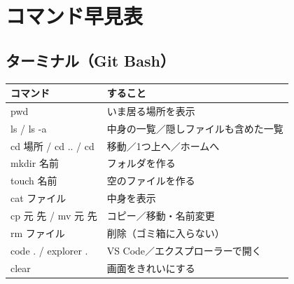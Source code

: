 \chapter{コマンド早見表}

\section*{ターミナル（Git Bash）}
\begin{center}\small
\begin{tabularx}{\linewidth}{>{\ttfamily}l X}
\toprule
\normalfont コマンド & すること \\
\midrule
pwd & いま居る場所を表示 \\
ls / ls -a & 中身の一覧／隠しファイルも含めた一覧 \\
cd 場所 / cd .. / cd & 移動／1つ上へ／ホームへ \\
mkdir 名前 & フォルダを作る \\
touch 名前 & 空のファイルを作る \\
cat ファイル & 中身を表示 \\
cp 元 先 / mv 元 先 & コピー／移動・名前変更 \\
rm ファイル & 削除（ゴミ箱に入らない） \\
code . / explorer . & VS Code／エクスプローラーで開く \\
clear & 画面をきれいにする \\
\bottomrule
\end{tabularx}
\end{center}


